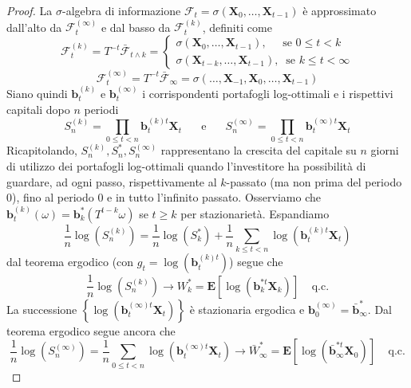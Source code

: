 \documentclass[a4paper,11pt]{book}
\theoremstyle{plain}
\theoremstyle{definition}
\theoremstyle{remark}
\newcommand{\X}{\bm{X}}
\newcommand{\B}{\bm{b}}
\newcommand{\F}{\mathcal{F}}
\newcommand{\E}{\mathbf{E}}
\begin{document}
\begin{proof}
	La $\sigma$-algebra di informazione $\F_t=\sigma(\X_0,\ldots, \X_{t-1})$ è approssimato dall'alto da $\F_t^{(\infty)}$ e dal basso da $\F_t^{(k)}$, definiti come
	\begin{equation*}
		\F_t^{(k)} = T^{-t}\bar{\F}_{t\wedge k} = \begin{cases}
		\sigma(\X_0, \ldots, \X_{t-1}), \;\;\;\;\; \text{se } 0\leq t <k\\
		\sigma(\X_{t-k},\ldots, \X_{t-1}), \;\; \text{se } k\leq t<\infty
		\end{cases}
	\end{equation*}
	\begin{equation*}
		\F_t^{(\infty)}=T^{-t}\bar{\F}_{\infty}=\sigma(\ldots, \X_{-1},\X_0,\ldots, \X_{t-1})
	\end{equation*}
	Siano quindi $\B_t^{(k)}$ e $\B_t^{(\infty)}$ i corrispondenti portafogli log-ottimali e i rispettivi capitali dopo $n$ periodi
	\begin{equation*}
		S_n^{(k)} = \prod_{0\leq t <n}{\B_t^{(k)t}\X_t} \;\;\;\;\; \text{ e } \;\;\;\;\; S_n^{(\infty)}=\prod_{0\leq t <n}{\B_t^{(\infty)t}\X_t}
	\end{equation*}
	Ricapitolando, $S_n^{(k)},S_n^*,S_n^{(\infty)}$ rappresentano la crescita del capitale su $n$ giorni di utilizzo dei portafogli log-ottimali quando l'investitore ha possibilità di guardare, ad ogni passo, rispettivamente al $k$-passato (ma non prima del periodo $0$), fino al periodo $0$ e in tutto l'infinito passato.\newline
	Osserviamo che $\B_t^{(k)}(\omega) = \B_k^*(T^{t-k}\omega)$ se $t\geq k$ per stazionarietà. Espandiamo
	\begin{equation*}
		\frac{1}{n}\log\left(S_n^{(k)}\right)=\frac{1}{n}\log (S_k^*)+\frac{1}{n}\sum_{k\leq t <n}{\log(\B_t^{(k)t}\X_t)}
	\end{equation*}
	dal teorema ergodico (con $g_t=\log(\B^{(k)t}_t)$) segue che
	\begin{equation*}
		\frac{1}{n}\log(S_n^{(k)})\rightarrow W^*_k=\E[\log(\B_k^{*t}\X_k)] \;\;\;\; \text{q.c.}
	\end{equation*}
	La successione $\left\{\log(\B_t^{(\infty)t}\X_t)\right\}$ è stazionaria ergodica e $\B_0^{(\infty)}=\bar{\B}_{\infty}^*$. Dal teorema ergodico segue ancora che
	\begin{equation*}
		\frac{1}{n}\log\left(S_n^{(\infty)}\right)=\frac{1}{n}\sum_{0\leq t <n}{\log(\B_t^{(\infty)t}\X_t)}\rightarrow \bar{W}^*_\infty = \E[\log(\bar{\B}_\infty^{*t}\X_0)]\;\;\;\;\text{q.c.}

\end{equation*}
\end{proof}
\end{document}
